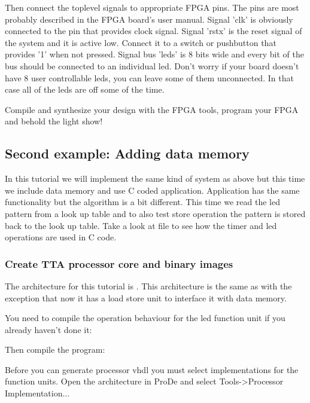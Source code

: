 \documentclass[twoside]{tceusermanual}
\begin{document}
Then connect the toplevel signals to appropriate FPGA pins. The pins are most
probably described in the FPGA board's user manual. Signal 'clk' is obviously
connected to the pin that provides clock signal. Signal 'rstx' is the reset
signal of the system and it is active low. Connect it to a switch or
pushbutton that provides '1' when not pressed. Signal bus 'leds' is 8 bits
wide and every bit of the bus should be connected to an individual led. Don't
worry if your board doesn't have 8 user controllable leds, you can leave some
of them unconnected. In that case all of the leds are off some of the time.

Compile and synthesize your design with the FPGA tools, program your FPGA and
behold the light show!

\subsection{Second example: Adding data memory}

In this tutorial we will implement the same kind of system as above but this
time we include data memory and use C coded application. Application has
the same functionality but the algorithm is a bit different. This time we read the
led pattern from a look up table and to also test store operation the pattern
is stored back to the look up table. Take a look at file 
to see how the timer and led operations are used in C code.

\subsubsection{Create TTA processor core and binary images}

The architecture for this tutorial is . This architecture
is the same as  with the exception that now it has a load
store unit to interface it with data memory.

You need to compile the operation behaviour for the led function unit if you
already haven't done it:


Then compile the program:


Before you can generate processor vhdl you must select implementations for
the function units. Open the architecture in ProDe and select Tools->Processor
Implementation...
\end{document}
